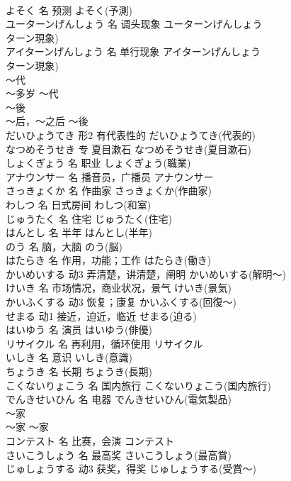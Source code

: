 \documentclass[8pt]{extreport}
\begin{document}
\begin{CJK}{UTF8}{min}
\\	よそく	名	预测	よそく(予測)	
\\	ユーターンげんしょう	名	调头现象	ユーターンげんしょう
\\	ターン現象)	
\\	アイターンげんしょう	名	单行现象	アイターンげんしょう
\\	ターン現象)	
\\	～代	
\\	～多岁	～代	
\\	～後	
\\	～后，～之后	～後	
\\	だいひょうてき	形2	有代表性的	だいひょうてき(代表的)	
\\	なつめそうせき	专	夏目漱石	なつめそうせき(夏目漱石)	
\\	しょくぎょう	名	职业	しょくぎょう(職業)	
\\	アナウンサー	名	播音员，广播员	アナウンサー	
\\	さっきょくか	名	作曲家	さっきょくか(作曲家)	
\\	わしつ	名	日式房间	わしつ(和室)	
\\	じゅうたく	名	住宅	じゅうたく(住宅)	
\\	はんとし	名	半年	はんとし(半年)	
\\	のう	名	脑，大脑	のう(脳)	
\\	はたらき	名	作用，功能；工作	はたらき(働き)	
\\	かいめいする	动3	弄清楚，讲清楚，阐明	かいめいする(解明～)	
\\	けいき	名	市场情况，商业状况，景气	けいき(景気)	
\\	かいふくする	动3	恢复；康复	かいふくする(回復～)	
\\	せまる	动1	接近，迫近，临近	せまる(迫る)	
\\	はいゆう	名	演员	はいゆう(俳優)	
\\	リサイクル	名	再利用，循环使用	リサイクル	
\\	いしき	名	意识	いしき(意識)	
\\	ちょうき	名	长期	ちょうき(長期)	
\\	こくないりょこう	名	国内旅行	こくないりょこう(国内旅行)	
\\	でんきせいひん	名	电器	でんきせいひん(電気製品)	
\\	～家	
\\	～家	～家	
\\	コンテスト	名	比赛，会演	コンテスト	
\\	さいこうしょう	名	最高奖	さいこうしょう(最高賞)	
\\	じゅしょうする	动3	获奖，得奖	じゅしょうする(受賞～)	

\end{CJK}
\end{document}
